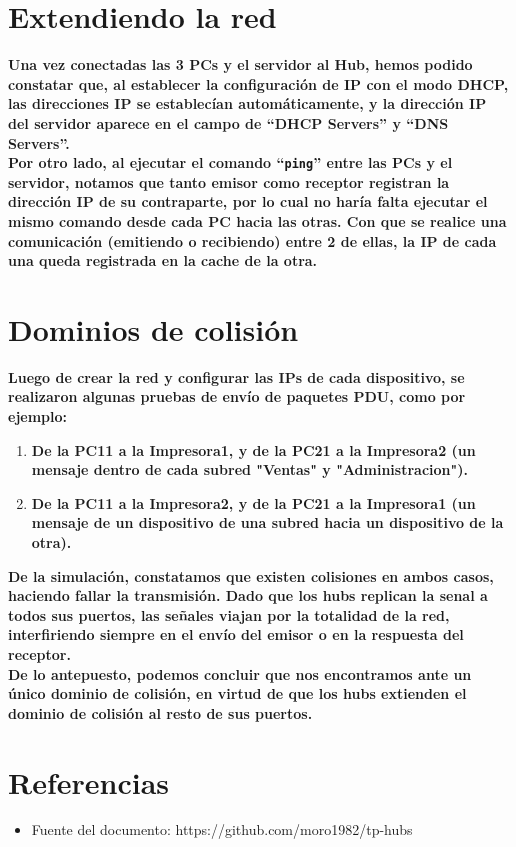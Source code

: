 \documentclass{article}
\begin{document}
\newpage

\section{Extendiendo la red}
\textbf{Una vez conectadas las 3 PCs y el servidor al Hub, hemos podido constatar que, al establecer la configuraci\'{o}n de IP con el modo DHCP, las direcciones IP se establec\'{i}an autom\'{a}ticamente, y la direcci\'{o}n IP del servidor aparece en el campo de ``DHCP Servers'' y ``DNS Servers''.} \\

\textbf{Por otro lado, al ejecutar el comando ``\texttt{ping}'' entre las PCs y el servidor, notamos que tanto emisor como receptor registran la direcci\'{o}n IP de su contraparte, por lo cual no har\'{i}a falta ejecutar el mismo comando desde cada PC hacia las otras. Con que se realice una comunicaci\'{o}n (emitiendo o recibiendo) entre 2 de ellas, la IP de cada una queda registrada en la cache de la otra.} \\

\section{Dominios de colisi\'{o}n}
\textbf{Luego de crear la red y configurar las IPs de cada dispositivo, se realizaron algunas pruebas de env\'{i}o de paquetes PDU, como por ejemplo:} \\

\begin{enumerate}
    \item \textbf{ De la PC11 a la Impresora1, y de la PC21 a la Impresora2 (un mensaje dentro de cada subred "Ventas" y "Administracion"). }
    \item \textbf{ De la PC11 a la Impresora2, y de la PC21 a la Impresora1 (un mensaje de un dispositivo de una subred hacia un dispositivo de la otra). }
\end{enumerate}

\textbf{ De la simulaci\'{o}n, constatamos que existen colisiones en ambos casos, haciendo fallar la transmisi\'{o}n. Dado que los hubs replican la senal a todos sus puertos, las señales viajan por la totalidad de la red, interfiriendo siempre en el env\'{i}o del emisor o en la respuesta del receptor. } \\

\textbf{ De lo antepuesto, podemos concluir que nos encontramos ante un \'{u}nico dominio de colisi\'{o}n, en virtud de que los hubs extienden el dominio de colisi\'{o}n al resto de sus puertos. }

\newpage
\section{Referencias}
\begin{itemize}
    \item Fuente del documento: https://github.com/moro1982/tp-hubs
\end{itemize}
\end{document}
